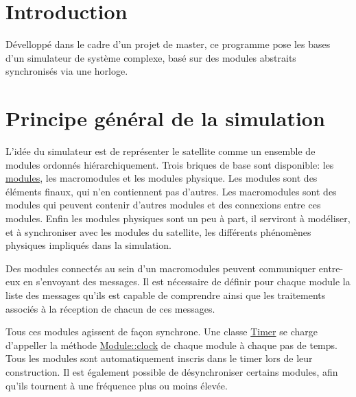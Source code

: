 \hypertarget{index_intro_sec}{}\section{Introduction}\label{index_intro_sec}
Dévelloppé dans le cadre d'un projet de master, ce programme pose les bases d'un simulateur de système complexe, basé sur des modules abstraits synchronisés via une horloge.\hypertarget{index_general}{}\section{Principe général de la simulation}\label{index_general}
L'idée du simulateur est de représenter le satellite comme un ensemble de modules ordonnés hiérarchiquement. Trois briques de base sont disponible\-: les \hyperlink{docMacroModule}{modules}, les macromodules et les modules physique. Les modules sont des éléments finaux, qui n'en contiennent pas d'autres. Les macromodules sont des modules qui peuvent contenir d'autres modules et des connexions entre ces modules. Enfin les modules physiques sont un peu à part, il serviront à modéliser, et à synchroniser avec les modules du satellite, les différents phénomènes physiques impliqués dans la simulation.

Des modules connectés au sein d'un macromodules peuvent communiquer entre-\/eux en s'envoyant des messages. Il est nécessaire de définir pour chaque module la liste des messages qu'ils est capable de comprendre ainsi que les traitements associés à la réception de chacun de ces messages.

Tous ces modules agissent de façon synchrone. Une classe \hyperlink{classTimer}{Timer} se charge d'appeller la méthode \hyperlink{classModule_ab7ea9648fa500696c85e93ebd0666390}{Module\-::clock} de chaque module à chaque pas de temps. Tous les modules sont automatiquement inscris dans le timer lors de leur construction. Il est également possible de désynchroniser certains modules, afin qu'ils tournent à une fréquence plus ou moins élevée.

